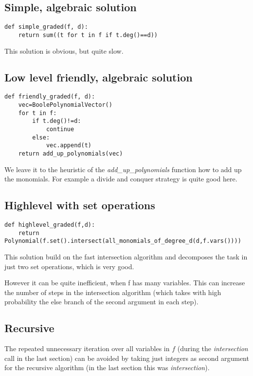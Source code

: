 \documentclass[]{article}
\newcommand{\functionname}[1]{\textit{#1}\xspace}
\begin{document}
\subsection{Simple, algebraic solution}
\begin{verbatim}
def simple_graded(f, d):
    return sum((t for t in f if t.deg()==d))   
\end{verbatim}
This solution is obvious, but quite slow.
\subsection{Low level friendly, algebraic solution}
\begin{verbatim}
def friendly_graded(f, d):
    vec=BoolePolynomialVector()
    for t in f:
        if t.deg()!=d:
            continue
        else:
            vec.append(t)
    return add_up_polynomials(vec)
\end{verbatim}
We leave it to the heuristic of the \functionname{add\_up\_polynomials} function how to add up the monomials. For example a divide and conquer strategy is quite good here.
\subsection{Highlevel with set operations}
\begin{verbatim}
def highlevel_graded(f,d):
    return Polynomial(f.set().intersect(all_monomials_of_degree_d(d,f.vars())))
\end{verbatim}
This solution build on the fast intersection algorithm and decomposes the task in just two set operations, which is very good.

However it can be quite inefficient, when f has many variables.
This can increase the number of steps in the intersection algorithm (which takes with high probability the else branch of the second argument in each step).
\subsection{Recursive}
The repeated unnecessary iteration over all variables in $f$ (during the \functionname{intersection} call in the last section) can be avoided by taking just integers as second argument for the recursive algorithm (in the last section this was \functionname{intersection}).
\end{document}
